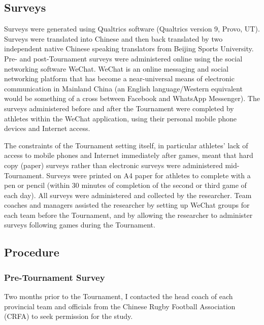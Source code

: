 \subsection{Surveys}
Surveys were generated using Qualtrics software (Qualtrics version 9, Provo, UT). Surveys were translated into Chinese and then back translated by two independent native Chinese speaking translators from Beijing Sports University.  Pre- and post-Tournament surveys were administered online using the social networking software WeChat. WeChat is an online messaging and social networking platform that has become a near-universal means of electronic communication in Mainland China (an English language/Western equivalent would be something of a cross between Facebook and WhatsApp Messenger). The surveys administered before and after the Tournament were completed by athletes within the WeChat application, using their personal mobile phone devices and Internet access.

The constraints of the Tournament setting itself, in particular athletes’ lack of access to mobile phones and Internet immediately after games, meant that hard copy (paper) surveys rather than electronic surveys were administered mid-Tournament. Surveys were printed on A4 paper for athletes to complete with a pen or pencil (within 30 minutes of completion of the second or third game of each day). All surveys were administered and collected by the researcher. Team coaches and managers assisted the researcher by setting up WeChat groups for each team before the Tournament, and by allowing the researcher to administer surveys following games during the Tournament.



















\clearpage



\subsection{Procedure}

  \subsubsection{Pre-Tournament Survey}
Two months prior to the Tournament, I contacted the head coach of each provincial team and officials from the Chinese Rugby Football Association (CRFA) to seek permission for the study.

